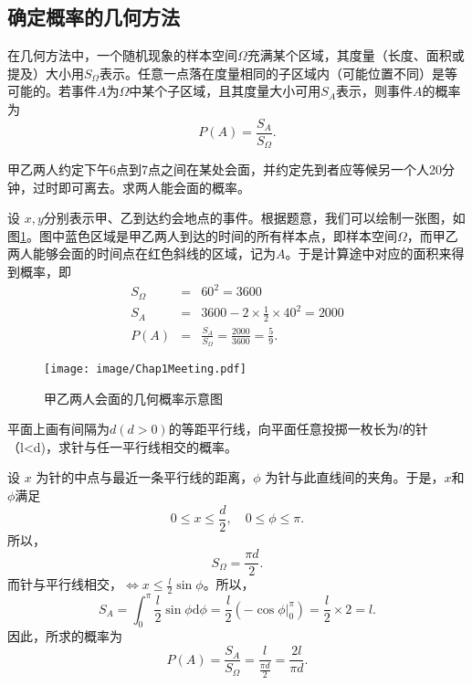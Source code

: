 \subsection{确定概率的几何方法}
在几何方法中，一个随机现象的样本空间$\Omega$充满某个区域，其度量（长度、面积或提及）大小用$S_{\Omega}$表示。任意一点落在度量相同的子区域内（可能位置不同）是等可能的。若事件$A$为$\Omega$中某个子区域，且其度量大小可用$S_A$表示，则事件$A$的概率为
         $$
         P(A) = \frac{S_A}{S_{\Omega}}.
         $$
     
     \begin{example}[(会面问题)]
    甲乙两人约定下午6点到7点之间在某处会面，并约定先到者应等候另一个人20分钟，过时即可离去。求两人能会面的概率。
    \end{example}
\begin{solution}
设 $x,y$分别表示甲、乙到达约会地点的事件。根据题意，我们可以绘制一张图，如图\ref{fig:chap01_meeting}。图中蓝色区域是甲乙两人到达的时间的所有样本点，即样本空间$\Omega$，而甲乙两人能够会面的时间点在红色斜线的区域，记为$A$。于是计算途中对应的面积来得到概率，即
    \begin{eqnarray*}
        S_{\Omega} &=& 60^2 = 3600\\
        S_A &=& 3600 - 2 \times \frac{1}{2} \times 40^2= 2000\\
        P(A) &=& \frac{S_A}{S_{\Omega}} = \frac{2000}{3600} = \frac{5}{9}.
    \end{eqnarray*}
    \begin{figure}[ht]
        \centering
\texttt{[image: image/Chap1Meeting.pdf]}
        \caption{甲乙两人会面的几何概率示意图}
        \label{fig:chap01_meeting}
    \end{figure}
    \end{solution}
 \begin{example}[(蒲丰投针)]
    平面上画有间隔为$d(d>0)$的等距平行线，向平面任意投掷一枚长为$l$的针（l<d)，求针与任一平行线相交的概率。
    \end{example}
    \begin{solution}
        设 $x$ 为针的中点与最近一条平行线的距离，$\phi$ 为针与此直线间的夹角。于是，$x$和$\phi$满足
    $$
    0\leq x\leq \frac{d}{2}, \quad 0\leq \phi \leq \pi.
    $$
    所以，$$
    S_{\Omega} = \frac{\pi d}{2}.
    $$
    而针与平行线相交，$\Leftrightarrow x\leq \frac{l}{2}\sin\phi$。所以，
    $$
    S_A = \int_0^{\pi} \frac{l}{2} \sin \phi \text{d} \phi  = \frac{l}{2} \left(-\cos \phi |_0^{\pi}\right) = \frac{l}{2}\times 2 = l.
    $$
    因此，所求的概率为
    $$
    P(A) = \frac{S_A}{S_{\Omega}} = \frac{l}{\frac{\pi d}{2}} = \frac{2l}{\pi d}.
    $$
    \end{solution}
